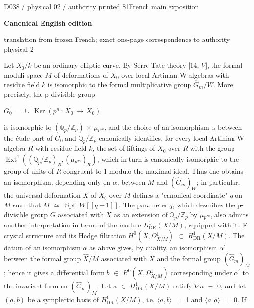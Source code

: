 \documentclass[9pt]{article}
\newcommand{\CanonHeading}[1]{\par\vspace{1.5pt}{\fontsize{8.6}{10.0}\selectfont\sffamily\bfseries\color{Accent} #1\par}\vspace{1.5pt}}
\newcommand{\CanonText}[1]{\par{\fontsize{8.0}{9.35}\selectfont\RaggedRight #1\par}\vspace{2.2pt}}
\newcommand{\CanonDisplay}[1]{\par\vspace{1.2pt}\begin{center}{\fontsize{7.2}{8.4}\selectfont\(\displaystyle #1\)}\end{center}\vspace{1.2pt}}
\newcommand{\LayerTitle}{Canonical English edition}
\begin{document}
\newpage
\noindent\begin{minipage}[t][\dimexpr\textheight-5pt\relax][t]{\textwidth}
{\sffamily\fontsize{7.3}{8.2}\selectfont\color{Quiet} D038 / physical 02 / authority printed 81\hfill French main exposition}
\par{}\vspace{4.5pt}
{\sffamily\fontsize{10.4}{11.6}\selectfont\bfseries\color{Accent} \LayerTitle}
\par{\sffamily\fontsize{6.7}{7.7}\selectfont\color{Quiet} translation from frozen French; exact one-page correspondence to authority physical 2}
\vspace{5pt}
\CanonHeading{0. INTRODUCTION}
\CanonText{Let \(X_{0}/k\) be an ordinary elliptic curve. By Serre-Tate theory [14, \(V]\), the formal moduli space \(M\) of deformations of \(X_{0}\) over local Artinian W-algebras with residue field \(k\) is isomorphic to the formal multiplicative group \(\widehat{G}_{m}/W\). More precisely, the p-divisible group}
\CanonDisplay{G_{0}\,=\,\cup{}\,\operatorname{Ker}(p^{n}\,:\,X_{0}\,\to{}\,X_{0})}
\CanonText{is isomorphic to \((\mathbb{Q}_{p}/\mathbb{Z}_{p})\) \(\times{}\) \(\mu{}_{p^\infty{}}\), and the choice of an isomorphism \(\alpha{}\) between the étale part of \(G_{0}\) and \(\mathbb{Q}_{p}/\mathbb{Z}_{p}\) canonically identifies, for every local Artinian W-algebra \(R\) with residue field \(k\), the set of liftings of \(X_{0}\) over \(R\) with the group \(\operatorname{Ext}^{1}((\mathbb{Q}_{p}/\mathbb{Z}_{p})_{R},(\mu{}_{p^\infty{}})_{R})\), which in turn is canonically isomorphic to the group of units of \(R\) congruent to 1 modulo the maximal ideal. Thus one obtains an isomorphism, depending only on \(\alpha{}\), between \(M\) and \((\widehat{G}_{m})_{W}\); in particular, the universal deformation \(X\) of \(X_{0}\) over \(M\) defines a "canonical coordinate" \(q\) on \(M\) such that \(M\) \(\simeq{}\) \(\operatorname{Spf}\) \(W[[q-1]]\). The parameter \(q\), which describes the p-divisible group \(G\) associated with \(X\) as an extension of \(\mathbb{Q}_{p}/\mathbb{Z}_{p}\) by \(\mu{}_{p^\infty{}}\), also admits another interpretation in terms of the module \(H^{1}_{\mathrm{DR}}(X/M)\), equipped with its F-crystal structure and its Hodge filtration \(H^{0}(X,\Omega{}^{1}_{X/M})\) \(\subset{}\) \(H^{1}_{\mathrm{DR}}(X/M)\). The datum of an isomorphism \(\alpha{}\) as above gives, by duality, an isomorphism \(\alpha{}^{\prime}\) between the formal group \(\widehat{X}/M\) associated with \(X\) and the formal group \((\widehat{G}_{m})_{M}\); hence it gives a differential form \(b\) \(\in{}\) \(H^{0}(X,\Omega{}^{1}_{X/M})\) corresponding under \(\alpha{}^{\prime}\) to the invariant form on \((\widehat{G}_{m})_{M}\). Let a \(\in{}\) \(H^{1}_{\mathrm{DR}}(X/M)\) satisfy \(\nabla{}a\) \(=\) 0, and let \((a,b)\) be a symplectic basis of \(H^{1}_{\mathrm{DR}}(X/M)\), i.e. \(\langle{}a,b\rangle{}\) \(=\) 1 and \(\langle{}a,a\rangle{}\) \(=\) 0. If}

\end{minipage}
\end{document}
